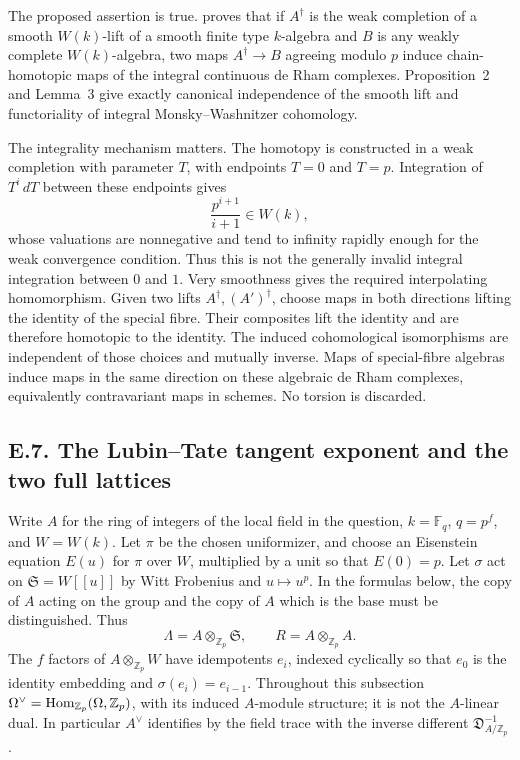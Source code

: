 The proposed assertion is true.  \cite[Proposition~1]{ErtlSprang2018} proves that if $A^\dagger$ is the weak completion of a smooth $W(k)$-lift of a smooth finite type $k$-algebra and $B$ is any weakly complete $W(k)$-algebra, two maps $A^\dagger\to B$ agreeing modulo $p$ induce chain-homotopic maps of the integral continuous de Rham complexes.  Proposition~2 and Lemma~3 give exactly canonical independence of the smooth lift and functoriality of integral Monsky--Washnitzer cohomology.

The integrality mechanism matters.  The homotopy is constructed in a weak completion with parameter $T$, with endpoints $T=0$ and $T=p$.  Integration of $T^i\,dT$ between these endpoints gives
\[
 \frac{p^{i+1}}{i+1}\in W(k),
\]
whose valuations are nonnegative and tend to infinity rapidly enough for the weak convergence condition.  Thus this is not the generally invalid integral integration between $0$ and $1$.  Very smoothness gives the required interpolating homomorphism.  Given two lifts $A^\dagger,(A')^\dagger$, choose maps in both directions lifting the identity of the special fibre.  Their composites lift the identity and are therefore homotopic to the identity.  The induced cohomological isomorphisms are independent of those choices and mutually inverse.  Maps of special-fibre algebras induce maps in the same direction on these algebraic de Rham complexes, equivalently contravariant maps in schemes.  No torsion is discarded.

\subsection{E.7. The Lubin--Tate tangent exponent and the two full lattices}

Write $A$ for the ring of integers of the local field in the question, $k=\mathbb F_q$, $q=p^f$, and $W=W(k)$.  Let $\pi$ be the chosen uniformizer, and choose an Eisenstein equation $E(u)$ for $\pi$ over $W$, multiplied by a unit so that $E(0)=p$.  Let $\sigma$ act on $\mathfrak S=W[[u]]$ by Witt Frobenius and $u\mapsto u^p$.  In the formulas below, the copy of $A$ acting on the group and the copy of $A$ which is the base must be distinguished.  Thus
\[
 \Lambda=A\otimes_{\mathbb Z_p}\mathfrak S,
 \qquad R=A\otimes_{\mathbb Z_p}A.
\]
The $f$ factors of $A\otimes_{\mathbb Z_p}W$ have idempotents $e_i$, indexed cyclically so that $e_0$ is the identity embedding and $\sigma(e_i)=e_{i-1}$.  Throughout this subsection $\Omega^\vee=\operatorname{Hom}_{\mathbb Z_p}(\Omega,\mathbb Z_p)$, with its induced $A$-module structure; it is not the $A$-linear dual.  In particular $A^\vee$ identifies by the field trace with the inverse different $\mathfrak D_{A/\mathbb Z_p}^{-1}$.

